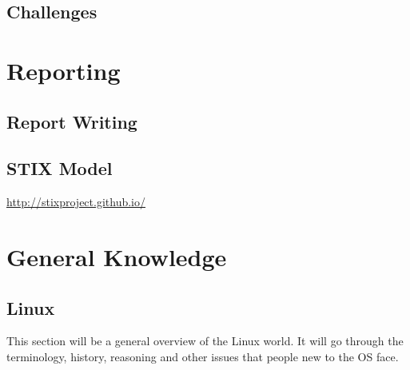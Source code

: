 \documentclass[a4paper,11pt]{report}
\begin{document}
	\section{Challenges}
\chapter{Reporting}
	\label{ch:Reporting}
	\section{Report Writing}
	\section{STIX Model}
		\url{http://stixproject.github.io/}
\newpage
\chapter{General Knowledge}
	\label{ch:GeneralKnowledge}
	\section{Linux}
		This section will be a general overview of the Linux world. 
		It will go through the terminology, history, reasoning and other issues that people new to the OS face. 
\end{document}
